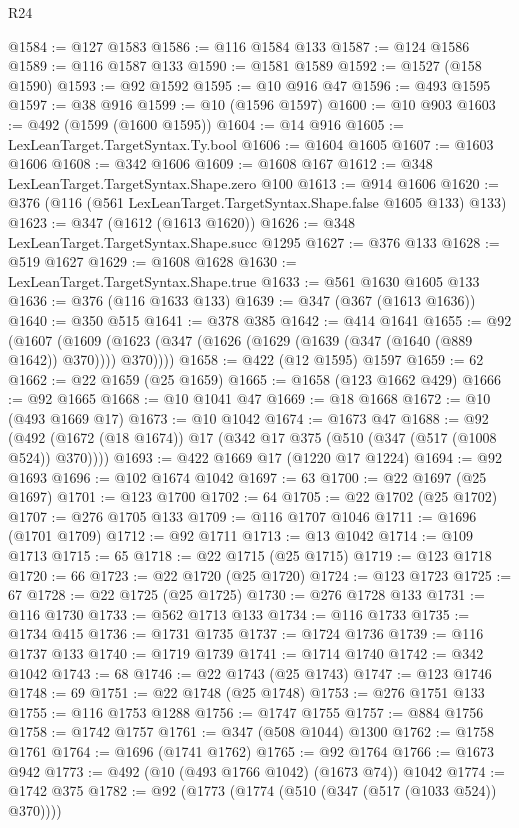 \begin{lexlean}{R24}
\begin{coremodule}
@1584 := @127 @1583
@1586 := @116 @1584 @133
@1587 := @124 @1586
@1589 := @116 @1587 @133
@1590 := @1581 @1589
@1592 := @1527 (@158 @1590)
@1593 := @92 @1592
@1595 := @10 @916 @47
@1596 := @493 @1595
@1597 := @38 @916
@1599 := @10 (@1596 @1597)
@1600 := @10 @903
@1603 := @492 (@1599 (@1600 @1595))
@1604 := @14 @916
@1605 := LexLeanTarget.TargetSyntax.Ty.bool
@1606 := @1604 @1605
@1607 := @1603 @1606
@1608 := @342 @1606
@1609 := @1608 @167
@1612 := @348 LexLeanTarget.TargetSyntax.Shape.zero @100
@1613 := @914 @1606
@1620 := @376 (@116 (@561 LexLeanTarget.TargetSyntax.Shape.false @1605 @133) @133)
@1623 := @347 (@1612 (@1613 @1620))
@1626 := @348 LexLeanTarget.TargetSyntax.Shape.succ @1295
@1627 := @376 @133
@1628 := @519 @1627
@1629 := @1608 @1628
@1630 := LexLeanTarget.TargetSyntax.Shape.true
@1633 := @561 @1630 @1605 @133
@1636 := @376 (@116 @1633 @133)
@1639 := @347 (@367 (@1613 @1636))
@1640 := @350 @515
@1641 := @378 @385
@1642 := @414 @1641
@1655 := @92
    (@1607 (@1609 (@1623 (@347 (@1626 (@1629 (@1639 (@347 (@1640 (@889 @1642)) @370)))) @370))))
@1658 := @422 (@12 @1595) @1597
@1659 := 62
@1662 := @22 @1659 (@25 @1659)
@1665 := @1658 (@123 @1662 @429)
@1666 := @92 @1665
@1668 := @10 @1041 @47
@1669 := @18 @1668
@1672 := @10 (@493 @1669 @17)
@1673 := @10 @1042
@1674 := @1673 @47
@1688 := @92 (@492 (@1672 (@18 @1674)) @17 (@342 @17 @375 (@510 (@347 (@517 (@1008 @524)) @370))))
@1693 := @422 @1669 @17 (@1220 @17 @1224)
@1694 := @92 @1693
@1696 := @102 @1674 @1042
@1697 := 63
@1700 := @22 @1697 (@25 @1697)
@1701 := @123 @1700
@1702 := 64
@1705 := @22 @1702 (@25 @1702)
@1707 := @276 @1705 @133
@1709 := @116 @1707 @1046
@1711 := @1696 (@1701 @1709)
@1712 := @92 @1711
@1713 := @13 @1042
@1714 := @109 @1713
@1715 := 65
@1718 := @22 @1715 (@25 @1715)
@1719 := @123 @1718
@1720 := 66
@1723 := @22 @1720 (@25 @1720)
@1724 := @123 @1723
@1725 := 67
@1728 := @22 @1725 (@25 @1725)
@1730 := @276 @1728 @133
@1731 := @116 @1730
@1733 := @562 @1713 @133
@1734 := @116 @1733
@1735 := @1734 @415
@1736 := @1731 @1735
@1737 := @1724 @1736
@1739 := @116 @1737 @133
@1740 := @1719 @1739
@1741 := @1714 @1740
@1742 := @342 @1042
@1743 := 68
@1746 := @22 @1743 (@25 @1743)
@1747 := @123 @1746
@1748 := 69
@1751 := @22 @1748 (@25 @1748)
@1753 := @276 @1751 @133
@1755 := @116 @1753 @1288
@1756 := @1747 @1755
@1757 := @884 @1756
@1758 := @1742 @1757
@1761 := @347 (@508 @1044) @1300
@1762 := @1758 @1761
@1764 := @1696 (@1741 @1762)
@1765 := @92 @1764
@1766 := @1673 @942
@1773 := @492 (@10 (@493 @1766 @1042) (@1673 @74)) @1042
@1774 := @1742 @375
@1782 := @92 (@1773 (@1774 (@510 (@347 (@517 (@1033 @524)) @370))))

\end{coremodule}
\end{lexlean}

